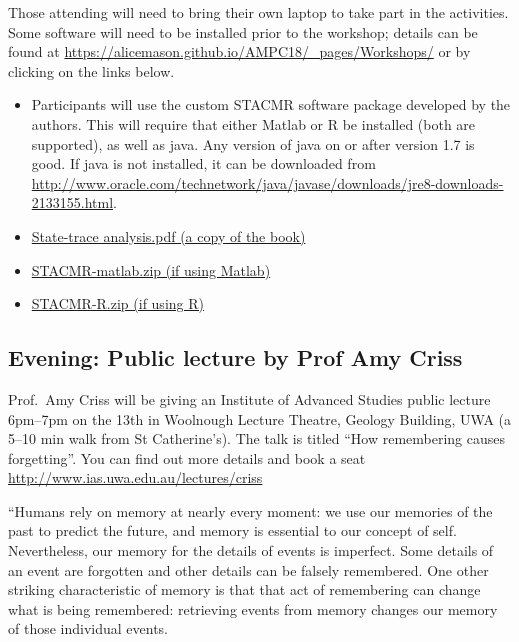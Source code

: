 \documentclass[]{article}
\providecommand{\tightlist}{%
  \setlength{\itemsep}{0pt}\setlength{\parskip}{0pt}}
\begin{document}
Those attending will need to bring their own laptop to take part in the
activities. Some software will need to be installed prior to the
workshop; details can be found at
\url{https://alicemason.github.io/AMPC18/_pages/Workshops/} or by
clicking on the links below.

\begin{itemize}
\tightlist
\item
  Participants will use the custom STACMR software package developed by
  the authors. This will require that either Matlab or R be installed
  (both are supported), as well as java. Any version of java on or after
  version 1.7 is good. If java is not installed, it can be downloaded
  from
  \url{http://www.oracle.com/technetwork/java/javase/downloads/jre8-downloads-2133155.html}.
\item
  \href{https://alicemason.github.io/AMPC18/assets/statetrace/sta.pdf}{State-trace
  analysis.pdf (a copy of the book)}
\item
  \href{https://alicemason.github.io/AMPC18/assets/statetrace/STACMR-matlab.zip}{STACMR-matlab.zip
  (if using Matlab)}
\item
  \href{https://alicemason.github.io/AMPC18/assets/statetrace/STACMR-R.zip}{STACMR-R.zip
  (if using R)}
\end{itemize}

\subsection{Evening: Public lecture by Prof Amy
Criss}\label{evening-public-lecture-by-prof-amy-criss}

Prof.~Amy Criss will be giving an Institute of Advanced Studies public
lecture 6pm--7pm on the 13th in Woolnough Lecture Theatre, Geology
Building, UWA (a 5--10 min walk from St Catherine's). The talk is titled
``How remembering causes forgetting''. You can find out more details and
book a seat \url{http://www.ias.uwa.edu.au/lectures/criss}

``Humans rely on memory at nearly every moment: we use our memories of
the past to predict the future, and memory is essential to our concept
of self. Nevertheless, our memory for the details of events is
imperfect. Some details of an event are forgotten and other details can
be falsely remembered. One other striking characteristic of memory is
that that act of remembering can change what is being remembered:
retrieving events from memory changes our memory of those individual
events.
\end{document}
